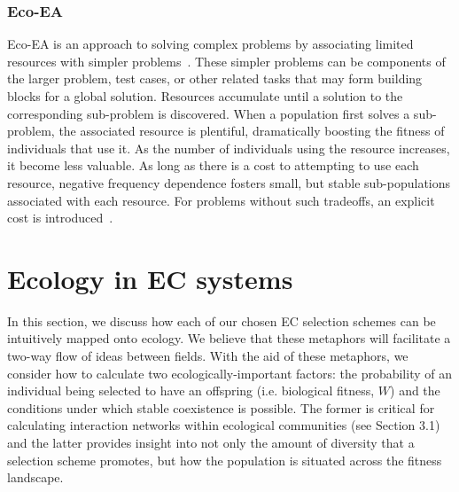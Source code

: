 \subsubsection{Eco-EA}

Eco-EA is an approach to solving complex problems by associating limited resources with simpler problems~\cite{goings_ecological_2009,goings_natural_2010,goings_ecology-based_2012}. These simpler problems can be components of the larger problem, test cases, or other related tasks that may form building blocks for a global solution. Resources accumulate until a solution to the corresponding sub-problem is discovered. When a population first solves a sub-problem, the associated resource is plentiful, dramatically boosting the fitness of individuals that use it.
As the number of individuals using the resource increases, it become less valuable. As long as there is a cost to attempting to use each resource, negative frequency dependence fosters small, but stable sub-populations associated with each resource. 
For
problems without such tradeoffs, an explicit cost is introduced~\cite{dolson_applying_2018}.

\section{Ecology in EC systems}

In this section, we discuss how each of our chosen EC selection schemes can be intuitively mapped onto ecology. We believe that these metaphors will facilitate a two-way flow of ideas between fields. With the aid of these metaphors, we consider how to calculate two ecologically-important factors: the probability of an individual being selected to have an offspring (i.e. biological fitness, $W$) and the conditions under which stable coexistence is possible. The former is critical for calculating interaction networks within ecological communities (see Section 3.1) and the latter provides insight into not only the amount of diversity that a selection scheme promotes, but how the population is situated across the fitness landscape.

